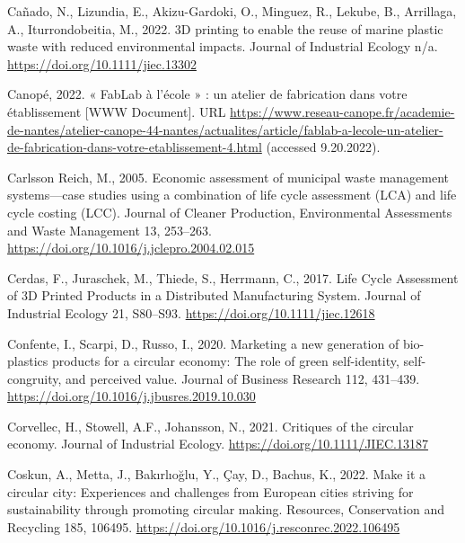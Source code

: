 \documentclass[12pt]{elsarticle} %
\newlength{\cslhangindent}
\newlength{\cslentryspacingunit} %
\newenvironment{CSLReferences}[2] %
 {%
  \setlength{\parindent}{0pt}
  \ifodd #1
  \let\oldpar\par
  \def\par{\hangindent=\cslhangindent\oldpar}
  \fi
  \setlength{\parskip}{#2\cslentryspacingunit}
 }%
 {}
\begin{document}
\begin{CSLReferences}{1}{0}
\leavevmode{}%
Cañado, N., Lizundia, E., Akizu-Gardoki, O., Minguez, R., Lekube, B., Arrillaga, A., Iturrondobeitia, M., 2022. {3D} printing to enable the reuse of marine plastic waste with reduced environmental impacts. Journal of Industrial Ecology n/a. \url{https://doi.org/10.1111/jiec.13302}

\leavevmode{}%
Canopé, 2022. « FabLab à l'école » : un atelier de fabrication dans votre établissement {[}WWW Document{]}. URL \url{https://www.reseau-canope.fr/academie-de-nantes/atelier-canope-44-nantes/actualites/article/fablab-a-lecole-un-atelier-de-fabrication-dans-votre-etablissement-4.html} (accessed 9.20.2022).

\leavevmode{}%
Carlsson Reich, M., 2005. Economic assessment of municipal waste management systems---case studies using a combination of life cycle assessment ({LCA}) and life cycle costing ({LCC}). Journal of Cleaner Production, Environmental {Assessments} and {Waste Management} 13, 253--263. \url{https://doi.org/10.1016/j.jclepro.2004.02.015}

\leavevmode{}%
Cerdas, F., Juraschek, M., Thiede, S., Herrmann, C., 2017. Life {Cycle Assessment} of {3D Printed Products} in a {Distributed Manufacturing System}. Journal of Industrial Ecology 21, S80--S93. \url{https://doi.org/10.1111/jiec.12618}

\leavevmode{}%
Confente, I., Scarpi, D., Russo, I., 2020. Marketing a new generation of bio-plastics products for a circular economy: {The} role of green self-identity, self-congruity, and perceived value. Journal of Business Research 112, 431--439. \url{https://doi.org/10.1016/j.jbusres.2019.10.030}

\leavevmode{}%
Corvellec, H., Stowell, A.F., Johansson, N., 2021. Critiques of the circular economy. Journal of Industrial Ecology. \url{https://doi.org/10.1111/JIEC.13187}

\leavevmode{}%
Coskun, A., Metta, J., Bakırlıoğlu, Y., Çay, D., Bachus, K., 2022. Make it a circular city: {Experiences} and challenges from {European} cities striving for sustainability through promoting circular making. Resources, Conservation and Recycling 185, 106495. \url{https://doi.org/10.1016/j.resconrec.2022.106495}


\end{CSLReferences}
\end{document}
